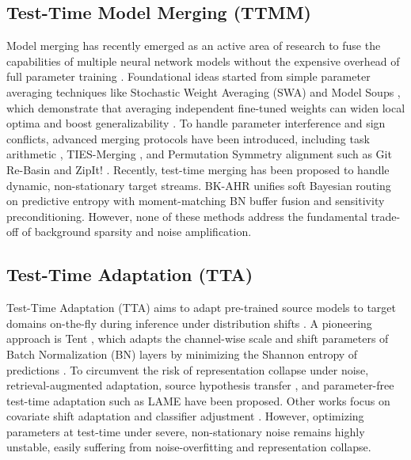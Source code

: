\documentclass{article}
\theoremstyle{plain}
\theoremstyle{definition}
\theoremstyle{remark}
\begin{document}
\subsection{Test-Time Model Merging (TTMM)}
Model merging has recently emerged as an active area of research to fuse the capabilities of multiple neural network models without the expensive overhead of full parameter training \cite{matena2021merging, jin2022dataless}. Foundational ideas started from simple parameter averaging techniques like Stochastic Weight Averaging (SWA) \cite{izmailov2018averaging} and Model Soups \cite{wortsman2022model}, which demonstrate that averaging independent fine-tuned weights can widen local optima and boost generalizability \cite{choshen2022fusing}. To handle parameter interference and sign conflicts, advanced merging protocols have been introduced, including task arithmetic \cite{ilharco2022editing}, TIES-Merging \cite{yadav2023ties}, and Permutation Symmetry alignment such as Git Re-Basin \cite{ainsworth2023git} and ZipIt! \cite{stoica2023zip}. Recently, test-time merging has been proposed to handle dynamic, non-stationary target streams. BK-AHR \cite{anonymous2026a} unifies soft Bayesian routing on predictive entropy with moment-matching BN buffer fusion and sensitivity preconditioning. However, none of these methods address the fundamental trade-off of background sparsity and noise amplification.

\subsection{Test-Time Adaptation (TTA)}
Test-Time Adaptation (TTA) aims to adapt pre-trained source models to target domains on-the-fly during inference under distribution shifts \cite{sun2020test, xiao2024beyond}. A pioneering approach is Tent \cite{wang2021tent}, which adapts the channel-wise scale and shift parameters of Batch Normalization (BN) layers by minimizing the Shannon entropy of predictions \cite{ioffe2015batch}. To circumvent the risk of representation collapse under noise, retrieval-augmented adaptation, source hypothesis transfer \cite{liang2020we}, and parameter-free test-time adaptation such as LAME \cite{boudiaf2022parameter} have been proposed. Other works focus on covariate shift adaptation \cite{schneider2020improving} and classifier adjustment \cite{iwasawa2021test}. However, optimizing parameters at test-time under severe, non-stationary noise remains highly unstable, easily suffering from noise-overfitting and representation collapse.
\end{document}
